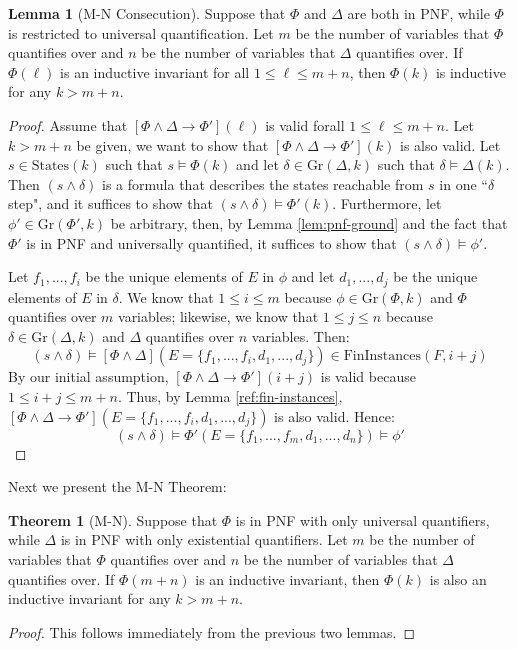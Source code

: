 \documentclass[12pt]{article}
\theoremstyle{definition}
\newtheorem{lemma}{Lemma}
\newtheorem{theorem}{Theorem}
\theoremstyle{remark}
\newcommand{\states}{\text{States}}
\newcommand{\gr}{\text{Gr}}
\newcommand{\fininstances}{\text{FinInstances}}
\begin{document}
\begin{lemma}[M-N Consecution]
  Suppose that $\Phi$ and $\Delta$ are both in PNF, while $\Phi$ is restricted to universal quantification.  Let $m$ be the number of variables that $\Phi$ quantifies over and $n$ be the number of variables that $\Delta$ quantifies over.  If $\Phi(\ell)$ is an inductive invariant for all $1 \leq \ell \leq m+n$, then $\Phi(k)$ is inductive for any $k>m+n$.
\end{lemma}
\begin{proof}
  Assume that $[\Phi\land\Delta \rightarrow \Phi'](\ell)$ is valid forall $1 \leq \ell \leq m+n$.  Let $k>m+n$ be given, we want to show that $[\Phi\land\Delta \rightarrow \Phi'](k)$ is also valid.  Let $s \in \states(k)$ such that $s \models \Phi(k)$ and let $\delta \in \gr(\Delta,k)$ such that $\delta \models \Delta(k)$.  Then $(s \land \delta)$ is a formula that describes the states reachable from $s$ in one ``$\delta$ step", and it suffices to show that $(s \land \delta) \models \Phi'(k)$.  Furthermore, let $\phi' \in \gr(\Phi',k)$ be arbitrary, then, by Lemma \ref{lem:pnf-ground} and the fact that $\Phi'$ is in PNF and universally quantified, it suffices to show that $(s \land \delta) \models \phi'$.

  Let $f_1,...,f_i$ be the unique elements of $E$ in $\phi$ and let $d_1,...,d_j$ be the unique elements of $E$ in $\delta$.  We know that $1 \leq i \leq m$ because $\phi \in \gr(\Phi,k)$ and $\Phi$ quantifies over $m$ variables; likewise, we know that $1 \leq j \leq n$ because $\delta \in \gr(\Delta,k)$ and $\Delta$ quantifies over $n$ variables.  Then:
  $$(s \land \delta) \models [\Phi\land\Delta](E=\{f_1,...,f_i,d_1,...,d_j\}) \in \fininstances(F,i+j)$$
  By our initial assumption, $[\Phi\land\Delta \rightarrow \Phi'](i+j)$ is valid because $1 \leq i+j \leq m+n$.  Thus, by Lemma \ref{ref:fin-instances}, $[\Phi\land\Delta \rightarrow \Phi'](E=\{f_1,...,f_i,d_1,...,d_j\})$ is also valid.  Hence:
  $$(s \land \delta) \models \Phi'(E=\{f_1,...,f_m,d_1,...,d_n\}) \models \phi'$$
\end{proof}

Next we present the M-N Theorem:

\begin{theorem}[M-N]
  Suppose that $\Phi$ is in PNF with only universal quantifiers, while $\Delta$ is in PNF with only existential quantifiers.  Let $m$ be the number of variables that $\Phi$ quantifies over and $n$ be the number of variables that $\Delta$ quantifies over.  If $\Phi(m+n)$ is an inductive invariant, then $\Phi(k)$ is also an inductive invariant for any $k>m+n$.
\end{theorem}
\begin{proof}
  This follows immediately from the previous two lemmas.
\end{proof}





\end{document}
